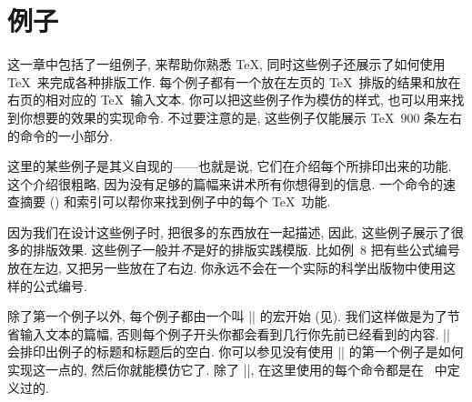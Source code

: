 

\chapter{例子}



这一章中包括了一组例子, 来帮助你熟悉 \TeX, 同时这些例子还展示了如何使用 \TeX\ 来完成各种排版工作.
每个例子都有一个放在左页的 \TeX\ 排版的结果和放在右页的相对应的 \TeX\ 输入文本.
你可以把这些例子作为模仿的样式, 也可以用来找到你想要的效果的实现命令.
不过要注意的是, 这些例子仅能展示 \TeX\ $900$ 条左右的命令的一小部分.

这里的某些例子是其义自现的——也就是说, 它们在介绍每个所排印出来的功能.
这个介绍很粗略, 因为没有足够的篇幅来讲术所有你想得到的信息.
一个命令的速查摘要 () 和索引可以帮你来找到例子中的每个 \TeX\ 功能.

因为我们在设计这些例子时, 把很多的东西放在一起描述,
因此, 这些例子展示了很多的排版效果.
这些例子一般并\emph{不}是好的排版实践模版.
比如例~8 把有些公式编号放在左边, 又把另一些放在了右边.
你永远不会在一个实际的科学出版物中使用这样的公式编号.

除了第一个例子以外, 每个例子都由一个叫 |\xmpheader| 的宏开始 (见).
我们这样做是为了节省输入文本的篇幅,
否则每个例子开头你都会看到几行你先前已经看到的内容.
|\xmpheader| 会排印出例子的标题和标题后的空白.
你可以参见没有使用 |\xmpheader| 的第一个例子是如何实现这一点的,
然后你就能模仿它了.
除了 |\xmpheader|, 在这里使用的每个命令都是在 \PlainTeX\ 中定义过的.

{%
   \let\bye = \relax %
}%

\ifoldeplain\else\ifcompletebook\else
\vfil{}
\fi\fi

\endchapter
\byebye
